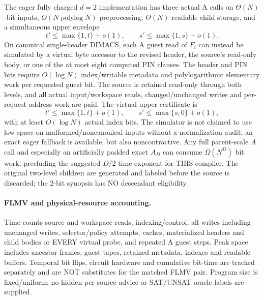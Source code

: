 \documentclass[11pt]{article}
\begin{document}
The eager fully charged $d=2$ implementation has three actual A calls
on $\Theta(N)$-bit inputs, $O(N\operatorname{polylog}N)$ preprocessing,
$\Theta(N)$ readable child storage, and a simultaneous upper envelope
\[
 t'\le\max\{1,t\}+o(1),\qquad s'\le\max\{1,s\}+o(1).
\]
On canonical single-header DIMACS, each A guest read of $F_i$ can
instead be simulated by a virtual byte accessor to the revised header,
the source's read-only body, or one of the at most eight computed PIN
clauses. The header and PIN bits require $O(\log N)$ index/writable
metadata and polylogarithmic elementary work per requested guest bit.
The source is retained read-only through both levels, and all actual
input/workspace reads, changed/unchanged writes and per-request address
work are paid. The virtual upper certificate is
\[
 t'\le\max\{1,t\}+o(1),\qquad s'\le\max\{s,0\}+o(1),
\]
with at least $O(\log N)$ actual index bits. The simulator is not
claimed to use low space on malformed/noncanonical inputs without a
normalization audit; an exact eager fallback is available, but also
noncontractive. Any full parent-scale $A$ call and especially an
artificially padded exact $A_D$ can consume $\Omega(N^D)$ bit work,
precluding the suggested $D/2$ time exponent for THIS compiler.
The original two-level children are generated and labeled before the
source is discarded; the 2-bit synopsis has NO descendant eligibility.

\paragraph{FLMV and physical-resource accounting.}
Time counts source and workspace reads, indexing/control, all writes
including unchanged writes, selector/policy attempts, caches, materialized
headers and child bodies or EVERY virtual probe, and repeated A guest
steps. Peak space includes ancestor frames, guest tapes, retained
metadata, indexes and readable buffers. Temporal bit flips, circuit
hardware and cumulative bit-time are tracked separately and are NOT
substitutes for the matched FLMV pair. Program size is fixed/uniform;
no hidden per-source advice or SAT/UNSAT oracle labels are supplied.
\end{document}
